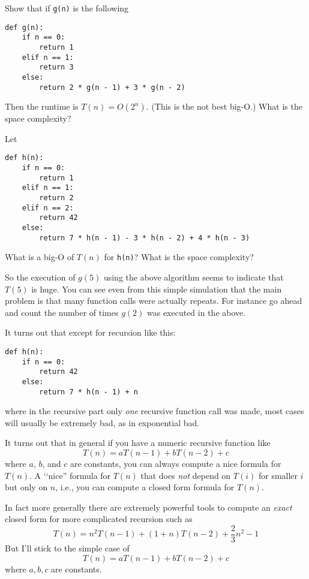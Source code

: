 \begin{ex}
  Show that if \verb!g(n)! is the following
\begin{Verbatim}[frame=single,fontsize=\footnotesize]
def g(n):
    if n == 0: 
        return 1
    elif n == 1:
        return 3
    else:
        return 2 * g(n - 1) + 3 * g(n - 2)
\end{Verbatim}
Then the runtime is $T(n) = O(2^n)$. (This is the not best big-O.)
What is the space complexity?
\end{ex}

\begin{ex}
  Let
\begin{Verbatim}[frame=single,fontsize=\footnotesize]
def h(n):
    if n == 0: 
        return 1
    elif n == 1:
        return 2
    elif n == 2:
        return 42
    else:
        return 7 * h(n - 1) - 3 * h(n - 2) + 4 * h(n - 3)
\end{Verbatim}
What is a big-O of $T(n)$ for \verb!h(n)!?
What is the space complexity?
\end{ex}


So the execution of $g(5)$ using the above algorithm
seems to indicate that $T(5)$ is huge.
You can see even from this simple simulation that the main
problem is that many function calls were actually repeats.
For instance go ahead and count the number of times
$g(2)$ was executed in the above.

It turns out that except for recursion like this:
\begin{Verbatim}[frame=single,fontsize=\footnotesize]
def h(n):
    if n == 0:
        return 42
    else:
        return 7 * h(n - 1) + n
\end{Verbatim}
where in the recursive part only \textit{one} recursive function call was made,
most cases will usually be extremely bad, as in exponential bad.

It turns out that in general if you have a numeric recursive function
like
\[
T(n) = aT(n - 1) + bT(n - 2) + c
\]
where $a$, $b$, and $c$ are constants,
you can always compute a nice formula for $T(n)$.
A \lq\lq nice'' formula for $T(n)$ that does \textit{not} depend on 
$T(i)$ for smaller $i$ but only on $n$, i.e.,
you can compute a closed form formula for $T(n)$.

In fact more generally there are extremely powerful 
tools to compute an \textit{exact} closed form for more complicated
recursion such as 
\[
T(n) = n^2 T(n-1) + (1 + n) T(n - 2) + \frac{2}{3}n^2 - 1 
\]
But I'll stick to the simple case of
\[
T(n) = aT(n - 1) + bT(n - 2) + c
\]
where $a,b,c$ are constants.

